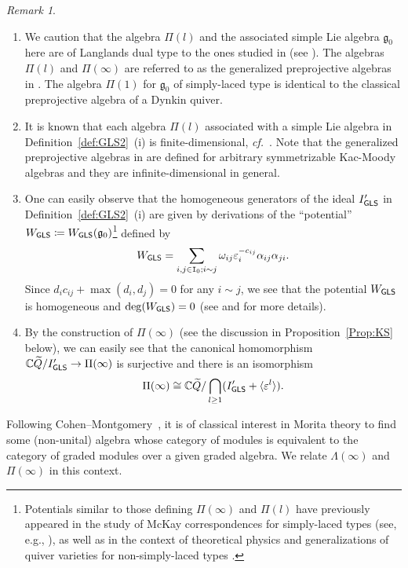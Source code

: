 \documentclass[12pt]{amsart}
\theoremstyle{definition}
\theoremstyle{remark}
\newtheorem{remark}[theorem]{Remark}
\numberwithin{equation}{section}
\newcommand{\confer}{\textit{cf.}\ }
\newcommand{\GLS}{{\sf GLS}}
\begin{document}
\begin{remark} \label{rmk:gls-potential}
    \begin{enumerate}
        \item[(i)]  
        We caution that the algebra $\Pi(l)$ and the associated simple Lie algebra $\mathfrak{g}_0$ here are of Langlands dual type to the ones studied in \cite{GLS-2017} (see \cite[Remark~2.1]{FM}). The algebras $\Pi(l)$ and $\Pi(\infty)$ are referred to as the generalized preprojective algebras in \cite{GLS-2017,FM}.
The algebra $\Pi(1)$ for $\mathfrak{g}_0$ of simply-laced type is identical to the classical preprojective algebra of a Dynkin quiver.
        \item[(ii)]  It is known that each algebra $\Pi(l)$ associated with a simple Lie algebra in Definition~\ref{def:GLS2}~(i) is finite-dimensional, \confer \cite[Corollary~11.13]{GLS-2017}.
        Note that the generalized preprojective algebras in \cite{GLS-2017} are defined for arbitrary symmetrizable Kac-Moody algebras and they are infinite-dimensional in general.
        \item[(iii)] One can easily observe that the homogeneous generators of the ideal $I'_{\GLS}$ in Definition~\ref{def:GLS2}~(i) are given by derivations of the ``potential'' $W_\GLS \coloneqq W_\GLS(\mathfrak{g}_0)$\footnote{Potentials similar to those defining $\Pi(\infty)$ and $\Pi(l)$ have previously appeared in the study of McKay correspondences for simply-laced types (see, e.g., \cite{BGK02,Moz11}), as well as in the context of theoretical physics and generalizations of quiver varieties for non-simply-laced types \cite{CD12,Yam10}.} defined by
\[
W_\GLS = \sum_{i, j\in \mathtt{I}_0; i\sim j} \omega_{ij}\varepsilon_i^{-c_{ij}} \alpha_{ij}\alpha_{ji}.
\]
Since $d_ic_{ij}+\max(d_i,d_j)=0$  for any $i\sim j$, we see that the potential $W_\GLS$ is homogeneous and $\deg(W_\GLS)=0$ (see \cite[\S 4.1, 4.3]{FM} and \cite[\S 1.7.3]{GLS-2017} for more details).
\item[(iv)] By the construction of $\Pi(\infty)$ (see the discussion in Proposition~\ref{Prop:KS} below), we can easily see that the canonical homomorphism $\mathbb C \widetilde{Q}/I'_\GLS \to \Pi(\infty)$ is surjective and there is an isomorphism
    \[\Pi(\infty)\cong \mathbb{C}\widetilde{Q}/\bigcap_{l\geq 1}(I'_\GLS + \langle \varepsilon^l\rangle).\]
    \end{enumerate}
\end{remark}

Following Cohen--Montgomery~\cite{CM84}, it is of classical interest in Morita theory to find some (non-unital) algebra whose category of modules is equivalent to the category of graded modules over a given graded algebra. We relate $\Lambda(\infty)$ and $\Pi(\infty)$ in this context. 
\end{document}
